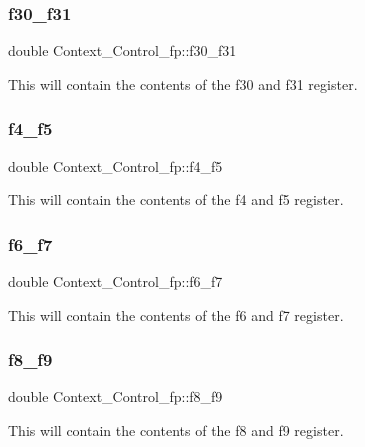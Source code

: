\subsubsection{\texorpdfstring{f30\_f31}{f30\_f31}}
{\footnotesize\ttfamily double Context\+\_\+\+Control\+\_\+fp\+::f30\+\_\+f31}

This will contain the contents of the f30 and f31 register. \mbox{\label{structContext__Control__fp_a3580e5a022a236fab085cb424905897b}} 
\subsubsection{\texorpdfstring{f4\_f5}{f4\_f5}}
{\footnotesize\ttfamily double Context\+\_\+\+Control\+\_\+fp\+::f4\+\_\+f5}

This will contain the contents of the f4 and f5 register. \mbox{\label{structContext__Control__fp_ad09be58b44ffadd4dd3f3a63c9cee847}} 
\subsubsection{\texorpdfstring{f6\_f7}{f6\_f7}}
{\footnotesize\ttfamily double Context\+\_\+\+Control\+\_\+fp\+::f6\+\_\+f7}

This will contain the contents of the f6 and f7 register. \mbox{\label{structContext__Control__fp_a532419f2edd6d0d3d336a36a5d4b0a47}} 
\subsubsection{\texorpdfstring{f8\_f9}{f8\_f9}}
{\footnotesize\ttfamily double Context\+\_\+\+Control\+\_\+fp\+::f8\+\_\+f9}

This will contain the contents of the f8 and f9 register. \mbox{\label{structContext__Control__fp_a27d47d32f23145958c3d3c2d32018896}} 

